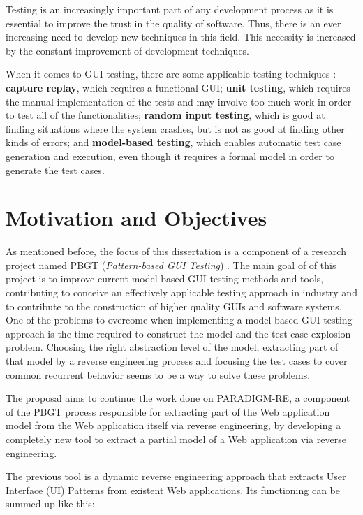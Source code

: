 Testing is an increasingly important part of any development process as it is essential to improve the trust in the quality of software. Thus, there is an ever increasing need to develop new techniques in this field. This necessity is increased by the constant improvement of development techniques.

When it comes to GUI testing, there are some applicable testing techniques \cite{memon2002gui}: \textbf{capture replay}, which requires a functional GUI; \textbf{unit testing}, which requires the manual implementation of the tests and may involve too much work in order to test all of the functionalities; \textbf{random input testing}, which is good at finding situations where the system crashes, but is not as good at finding other kinds of errors; and \textbf{model-based testing}, which enables automatic test case generation and execution, even though it requires a formal model in order to generate the test cases.

\section{Motivation and Objectives} \label{sec:goals}

As mentioned before, the focus of this dissertation is a component of a research project named PBGT (\textit{Pattern-based GUI Testing}) \cite{moreira2013pattern}. The main goal of of this project is to improve current model-based GUI testing methods and tools, contributing to conceive an effectively applicable testing approach in industry and to contribute to the construction of higher quality GUIs and software systems. One of the problems to overcome when implementing a model-based GUI testing approach is the time required to construct the model and the test case explosion problem. Choosing the right abstraction level of the model, extracting part of that model by a reverse engineering process and focusing the test cases to cover common recurrent behavior seems to be a way to solve these problems.

The proposal aims to continue the work done on PARADIGM-RE, a component of the PBGT process responsible for extracting part of the Web application model from the Web application itself via reverse engineering, by developing a completely new tool to extract a partial model of a Web application via reverse engineering.

The previous tool \cite{nabuco2013inferring,nabuco2014inferring} is a dynamic reverse engineering approach that extracts User Interface (UI) Patterns from existent Web applications. Its functioning can be summed up like this: 

